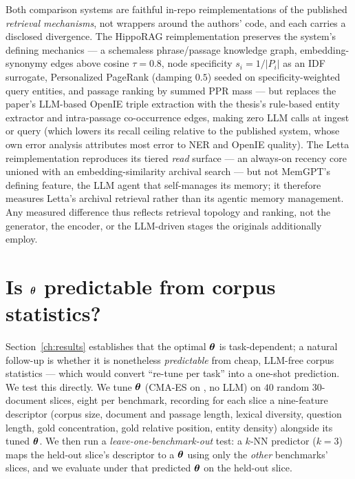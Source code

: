 Both comparison systems are faithful in-repo reimplementations of the published
\emph{retrieval mechanisms}, not wrappers around the authors' code, and each
carries a disclosed divergence. The HippoRAG reimplementation preserves the
system's defining mechanics --- a schemaless phrase/passage knowledge graph,
embedding-synonymy edges above cosine $\tau{=}0.8$, node specificity
$s_i{=}1/|P_i|$ as an IDF surrogate, Personalized PageRank (damping $0.5$) seeded
on specificity-weighted query entities, and passage ranking by summed PPR mass ---
but replaces the paper's LLM-based OpenIE triple extraction with the thesis's
rule-based entity extractor and intra-passage co-occurrence edges, making zero LLM
calls at ingest or query (which lowers its recall ceiling relative to the
published system, whose own error analysis attributes most error to NER and OpenIE
quality). The Letta reimplementation reproduces its tiered \emph{read} surface ---
an always-on recency core unioned with an embedding-similarity archival search ---
but not MemGPT's defining feature, the LLM agent that self-manages its memory; it
therefore measures Letta's archival retrieval rather than its agentic memory
management. Any measured difference thus reflects retrieval topology and ranking,
not the generator, the encoder, or the LLM-driven stages the originals additionally
employ.

\section{Is \texorpdfstring{$\boldsymbol{\theta}$}{theta} predictable from corpus statistics?}
\label{sec:thetapredict}
Section~\ref{ch:results} establishes that the optimal $\boldsymbol{\theta}$ is
task-dependent; a natural follow-up is whether it is nonetheless
\emph{predictable} from cheap, LLM-free corpus statistics --- which would convert
``re-tune per task'' into a one-shot prediction. We test this directly. We tune
$\boldsymbol{\theta}$ (CMA-ES on \recallk{}, no LLM) on $40$ random $30$-document slices,
eight per benchmark, recording for each slice a nine-feature descriptor (corpus
size, document and passage length, lexical diversity, question length, gold
concentration, gold relative position, entity density) alongside its tuned
$\boldsymbol{\theta}$. We then run a \emph{leave-one-benchmark-out} test: a $k$-NN
predictor ($k{=}3$) maps the held-out slice's descriptor to a $\boldsymbol{\theta}$ using
only the \emph{other} benchmarks' slices, and we evaluate \recallk{} under that
predicted $\boldsymbol{\theta}$ on the held-out slice.

